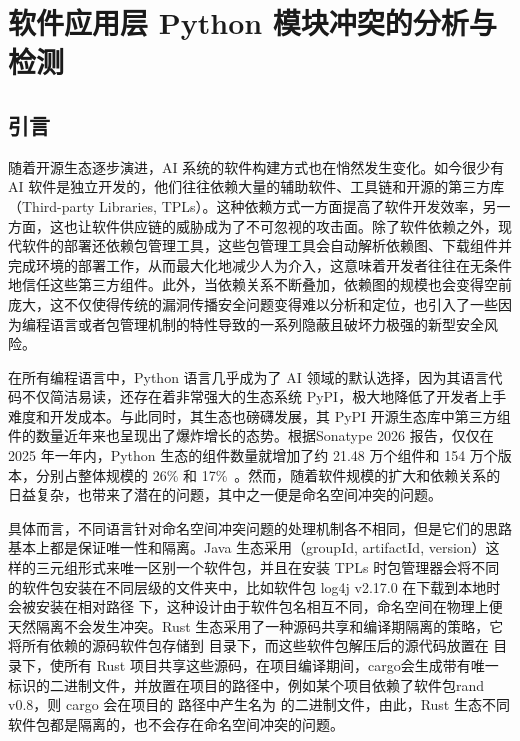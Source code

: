 \chapter{软件应用层 Python 模块冲突的分析与检测}
\section{引言}
随着开源生态逐步演进，AI 系统的软件构建方式也在悄然发生变化。如今很少有 AI 软件是独立开发的，他们往往依赖大量的辅助软件、工具链和开源的第三方库（Third-party Libraries, TPLs）。这种依赖方式一方面提高了软件开发效率，另一方面，这也让软件供应链的威胁成为了不可忽视的攻击面。除了软件依赖之外，现代软件的部署还依赖包管理工具，这些包管理工具会自动解析依赖图、下载组件并完成环境的部署工作，从而最大化地减少人为介入，这意味着开发者往往在无条件地信任这些第三方组件。此外，当依赖关系不断叠加，依赖图的规模也会变得空前庞大，这不仅使得传统的漏洞传播安全问题变得难以分析和定位，也引入了一些因为编程语言或者包管理机制的特性导致的一系列隐蔽且破坏力极强的新型安全风险。

在所有编程语言中，Python 语言几乎成为了 AI 领域的默认选择，因为其语言代码不仅简洁易读，还存在着非常强大的生态系统 PyPI，极大地降低了开发者上手难度和开发成本。与此同时，其生态也磅礴发展，其 PyPI 开源生态库中第三方组件的数量近年来也呈现出了爆炸增长的态势。根据Sonatype 2026 报告，仅仅在 2025 年一年内，Python 生态的组件数量就增加了约 21.48 万个组件和 154 万个版本，分别占整体规模的 26\% 和 17\%~\cite{sonatype2026software}。然而，随着软件规模的扩大和依赖关系的日益复杂，也带来了潜在的问题，其中之一便是命名空间冲突的问题。

具体而言，不同语言针对命名空间冲突问题的处理机制各不相同，但是它们的思路基本上都是保证唯一性和隔离。Java 生态采用（groupId, artifactId, version）这样的三元组形式来唯一区别一个软件包，并且在安装 TPLs 时包管理器会将不同的软件包安装在不同层级的文件夹中，比如软件包 log4j v2.17.0 在下载到本地时会被安装在相对路径  下，这种设计由于软件包名相互不同，命名空间在物理上便天然隔离不会发生冲突。Rust 生态采用了一种源码共享和编译期隔离的策略，它将所有依赖的源码软件包存储到  目录下，而这些软件包解压后的源代码放置在  目录下，使所有 Rust 项目共享这些源码，在项目编译期间，cargo会生成带有唯一标识的二进制文件，并放置在项目的路径中，例如某个项目依赖了软件包rand v0.8，则 cargo 会在项目的  路径中产生名为  的二进制文件，由此，Rust 生态不同软件包都是隔离的，也不会存在命名空间冲突的问题。


